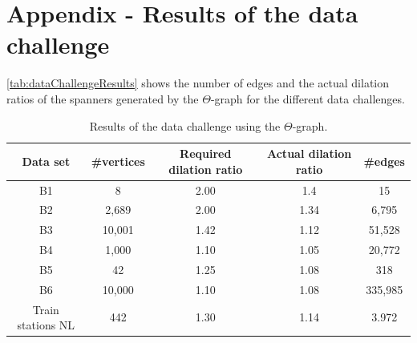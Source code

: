 \documentclass[a4paper,twoside,11pt,hidelinks]{article}
\theoremstyle{plain}
\theoremstyle{definition}  %
\begin{document}
\section{Appendix - Results of the data challenge}
\label{app:dataChallengeResults}
\autoref{tab:dataChallengeResults} shows the number of edges and the actual
dilation ratios of the spanners generated by the $\Theta$-graph for the
different data challenges.
\begin{table}[h!]
\centering
\begin{tabular}{c |c| c | c | c }
	Data set & \#vertices & Required dilation ratio & Actual dilation ratio
	& \#edges  \\ \hline 
	B1 & 8 & 2.00 & 1.4 & 15 \\
    B2 & 2,689 & 2.00 & 1.34 & 6,795 \\
    B3 & 10,001 & 1.42 & 1.12 & 51,528 \\
    B4 & 1,000 & 1.10 & 1.05 & 20,772 \\
    B5 & 42 & 1.25 & 1.08 & 318  \\
    B6 & 10,000 & 1.10 & 1.08 & 335,985 \\
    Train stations NL & 442 & 1.30 & 1.14 & 3.972 \\
\end{tabular}
\caption{Results of the data challenge using the $\Theta$-graph.}
\label{tab:dataChallengeResults}
\end{table}
\end{document}
